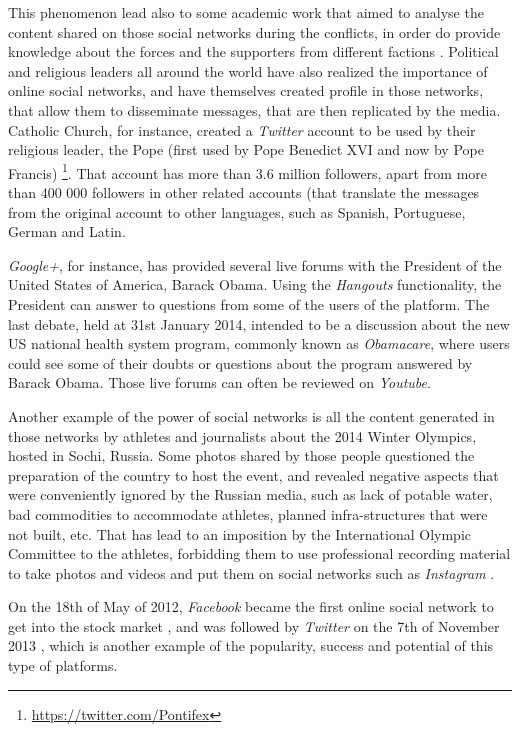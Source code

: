 This phenomenon lead also to some academic work that aimed to analyse the content shared on those social networks during the conflicts, in order do provide knowledge about the forces and the supporters from different factions \cite{kn:OPG+14}.
Political and religious leaders all around the world have also realized the importance of online social networks, and have themselves created profile in those networks, that allow them to disseminate messages, that are then replicated by the media. Catholic Church, for instance, created a \emph{Twitter} account to be used by their religious leader, the Pope (first used by Pope Benedict XVI and now by Pope Francis) \footnote{\url{https://twitter.com/Pontifex}}. That account has more than 3.6 million followers, apart from more than 400 000 followers in other related accounts (that translate the messages from the original account to other languages, such as Spanish, Portuguese, German and Latin.

\emph{Google+}, for instance, has provided several live forums with the President of the United States of America, Barack Obama. Using the \emph{Hangouts} functionality, the President can answer to questions from some of the users of the platform. The last debate, held at 31st January 2014, intended to be a discussion about the new US national health system program, commonly known as \emph{Obamacare}, where users could see some of their doubts or questions about the program answered by Barack Obama. Those live forums can often be reviewed on \emph{Youtube}.

Another example of the power of social networks is all the content generated in those networks by athletes and journalists about the 2014 Winter Olympics, hosted in Sochi, Russia. Some photos shared by those people questioned the preparation of the country to host the event, and revealed negative aspects that were conveniently ignored by the Russian media, such as lack of potable water, bad commodities to accommodate athletes, planned infra-structures that were not built, etc. That has lead to an imposition by the International Olympic Committee to the athletes, forbidding them to use professional recording material to take photos and videos and put them on social networks such as \emph{Instagram} \cite{kn:Sop14}.

On the 18th of May of 2012, \emph{Facebook} became the first online social network to get into the stock market \cite{kn:Del11}, and was followed by \emph{Twitter} on the 7th of November 2013 \cite{kn:Pos13}, which is another example of the popularity, success and potential of this type of platforms. 

